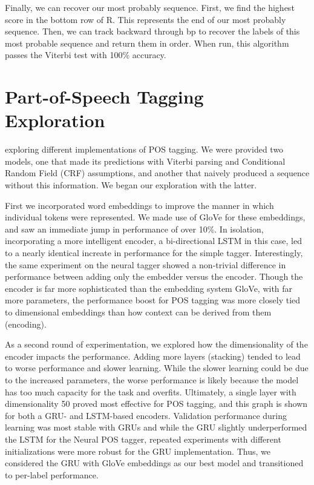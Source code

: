\documentclass[11pt,a4paper]{article}
\begin{document}
Finally, we can recover our most probably sequence. First, we find the highest score in the bottom row of R. This represents the end of our most probably sequence. Then, we can track backward through bp to recover the labels of this most probable sequence and return them in order. When run, this algorithm passes the Viterbi test with 100\% accuracy.


\section{Part-of-Speech Tagging Exploration}%
\label{sec:part_of_speech_tagging_exploration}

exploring different implementations of POS tagging. We were provided two models, one that made its predictions with Viterbi parsing and Conditional Random Field (CRF) assumptions, and another that naively produced a sequence without this information. We began our exploration with the latter.

First we incorporated word embeddings to improve the manner in which individual tokens were represented. We made use of GloVe for these embeddings, and saw an immediate jump in performance of over 10\%. In isolation, incorporating a more intelligent encoder, a bi-directional LSTM in this case, led to a nearly identical increate in performance for the simple tagger. Interestingly, the same experiment on the neural tagger showed a non-trivial difference in performance between adding only the embedder versus the encoder. Though the encoder is far more sophisticated than the embedding system GloVe, with far more parameters, the performance boost for POS tagging was more closely tied to dimensional embeddings than how context can be derived from them (encoding).

As a second round of experimentation, we explored how the dimensionality of the encoder impacts the performance. Adding more layers (stacking) tended to lead to worse performance and slower learning. While the slower learning could be due to the increased parameters, the worse performance is likely because the model has too much capacity for the task and overfits. Ultimately, a single layer with dimensionality 50 proved most effective for POS tagging, and this graph is shown for both a GRU- and LSTM-based encoders. Validation performance during learning was most stable with GRUs and while the GRU slightly underperformed the LSTM for the Neural POS tagger, repeated experiments with different initializations were more robust for the GRU implementation. Thus, we considered the GRU with GloVe embeddings as our best model and transitioned to per-label performance.
\end{document}
